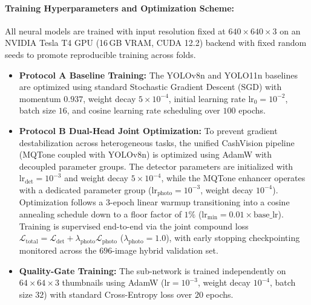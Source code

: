 \documentclass[final,5p,times,twocolumn,authoryear]{elsarticle}
\begin{document}
\paragraph{Training Hyperparameters and Optimization Scheme:}
All neural models are trained with input resolution fixed at $640 \times 640 \times 3$ on an NVIDIA Tesla T4 GPU (16\,GB VRAM, CUDA 12.2) backend with fixed random seeds to promote reproducible training across folds.
\begin{itemize}
    \item \textbf{Protocol A Baseline Training:} The YOLOv8n and YOLO11n baselines are optimized using standard Stochastic Gradient Descent (SGD) with momentum $0.937$, weight decay $5 \times 10^{-4}$, initial learning rate $\text{lr}_0 = 10^{-2}$, batch size $16$, and cosine learning rate scheduling over $100$ epochs.
    \item \textbf{Protocol B Dual-Head Joint Optimization:} To prevent gradient destabilization across heterogeneous tasks, the unified CashVision pipeline (MQTone coupled with YOLOv8n) is optimized using AdamW with decoupled parameter groups. The detector parameters are initialized with $\text{lr}_{\text{det}} = 10^{-3}$ and weight decay $5 \times 10^{-4}$, while the MQTone enhancer operates with a dedicated parameter group ($\text{lr}_{\text{photo}} = 10^{-3}$, weight decay $10^{-4}$). Optimization follows a $3$-epoch linear warmup transitioning into a cosine annealing schedule down to a floor factor of $1\%$ ($\text{lr}_{\text{min}} = 0.01 \times \text{base\_lr}$). Training is supervised end-to-end via the joint compound loss $\mathcal{L}_{\text{total}} = \mathcal{L}_{\text{det}} + \lambda_{\text{photo}} \mathcal{L}_{\text{photo}}$ ($\lambda_{\text{photo}} = 1.0$), with early stopping checkpointing monitored across the $696$-image hybrid validation set.
    \item \textbf{Quality-Gate Training:} The sub-network is trained independently on $64 \times 64 \times 3$ thumbnails using AdamW ($\text{lr} = 10^{-3}$, weight decay $10^{-4}$, batch size $32$) with standard Cross-Entropy loss over $20$ epochs.
\end{itemize}
\end{document}
